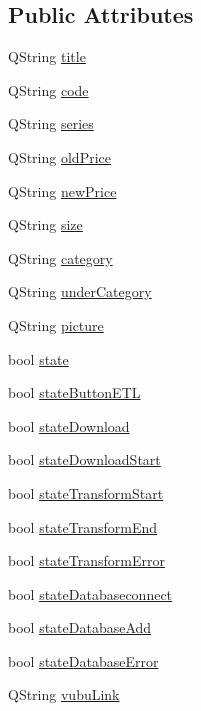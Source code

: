 \subsection*{Public Attributes}
\begin{DoxyCompactItemize}
\item 
Q\+String \mbox{\hyperlink{class_vubu_etl_project_a73b7eaeb25ea6a7fd5bbc9565748aa55}{title}}
\item 
Q\+String \mbox{\hyperlink{class_vubu_etl_project_ac2b42c7c93d507c3eb3bdcbd9a762028}{code}}
\item 
Q\+String \mbox{\hyperlink{class_vubu_etl_project_a28c771912257608794a3fa8e3c746c7c}{series}}
\item 
Q\+String \mbox{\hyperlink{class_vubu_etl_project_ab592731b0c19996de933e6676be00d3b}{old\+Price}}
\item 
Q\+String \mbox{\hyperlink{class_vubu_etl_project_a44e6f33f11dd304409f13c146d380abf}{new\+Price}}
\item 
Q\+String \mbox{\hyperlink{class_vubu_etl_project_a695e4e9ea4711a2af8f183860f56f218}{size}}
\item 
Q\+String \mbox{\hyperlink{class_vubu_etl_project_a052dea4f8c17043b3ed20b5c99d40c67}{category}}
\item 
Q\+String \mbox{\hyperlink{class_vubu_etl_project_ac2b56f3b84065b5212789505d94963b6}{under\+Category}}
\item 
Q\+String \mbox{\hyperlink{class_vubu_etl_project_aa94996b4befea6cddbc19a453f32f3f7}{picture}}
\item 
bool \mbox{\hyperlink{class_vubu_etl_project_a99267cd4310daf64856e62edb071b6da}{state}}
\item 
bool \mbox{\hyperlink{class_vubu_etl_project_aec793730a6d756fee5f78af01aff2611}{state\+Button\+E\+TL}}
\item 
bool \mbox{\hyperlink{class_vubu_etl_project_a1eb004aa2b362180cb32f57866ae0530}{state\+Download}}
\item 
bool \mbox{\hyperlink{class_vubu_etl_project_aab858f15bc40065223d9c9735fd7d700}{state\+Download\+Start}}
\item 
bool \mbox{\hyperlink{class_vubu_etl_project_a92c04377e0c8326b29017c617b69e797}{state\+Transform\+Start}}
\item 
bool \mbox{\hyperlink{class_vubu_etl_project_a956e9ade60ebdbf5f09d543ccbc972fc}{state\+Transform\+End}}
\item 
bool \mbox{\hyperlink{class_vubu_etl_project_ac04f10de0f0e066925de4191621ec9ad}{state\+Transform\+Error}}
\item 
bool \mbox{\hyperlink{class_vubu_etl_project_afd522348204bda9d10d6be7da2a86ce8}{state\+Databaseconnect}}
\item 
bool \mbox{\hyperlink{class_vubu_etl_project_ae0c8c525fb34483e86e9a2077dc3ce18}{state\+Database\+Add}}
\item 
bool \mbox{\hyperlink{class_vubu_etl_project_abe8fccc78e282db2ad37ca505d5e5ab1}{state\+Database\+Error}}
\item 
Q\+String \mbox{\hyperlink{class_vubu_etl_project_a098af5530f5fec86634d06cd704b394b}{vubu\+Link}}
\end{DoxyCompactItemize}
